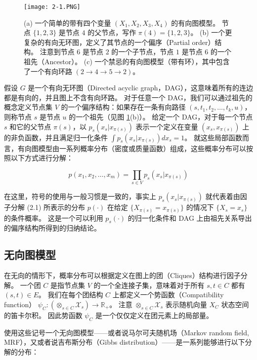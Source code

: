 \begin{figure}[htbp]
    \centering
    \texttt{[image: 2-1.PNG]}
    \caption{
        (a) 一个简单的带有四个变量 $(X_1, X_2, X_3, X_4)$ 的有向图模型。
        节点 $\{1, 2, 3\}$ 是节点 $4$ 的父节点，写作 $\pi(4) = \{1, 2, 3\}$。
        (b) 一个更复杂的有向无环图，定义了其节点的一个偏序（Partial order）结构。
        注意到节点 $6$ 是节点 $2$ 的一个子节点，节点 $1$ 是节点 $6$ 的一个祖先（Ancestor）。
        (c) 一个禁忌的有向图模型（带有环），其中包含了一个有向环路 $(2 \rightarrow 4 \rightarrow 5 \rightarrow 2)$。
    }\label{fig:2-1}
\end{figure}

假设 $G$ 是一个有向无环图（Directed acyclic graph，DAG），这意味着所有的连边都是有向的，并且图上不含有向环路。
对于任意一个 DAG，我们可以通过祖先的概念定义节点集 $V$ 的一个偏序结构：如果存在一条有向路径 $(s, t_1, t_2, \dots, t_k, u)$，则称节点 $s$ 是节点 $u$ 的一个祖先（见图 \ref{fig:2-1}(b)）。
给定一个 DAG，对于每一个节点 $s$ 和它的父节点 $\pi(s)$，以 $p_s(x_s|x_{\pi(s)})$ 表示一个定义在变量 $(x_s, x_{\pi(s)})$ 上的非负函数，并且满足归一化条件 $\int p_s(x_s|x_{\pi(s)})dx_s = 1$。
就这些局部函数而言，有向图模型由一系列概率分布（密度或质量函数）组成，这些概率分布可以按照以下方式进行分解：

\begin{equation}
    p(x_1, x_2, \dots, x_m) = \prod_{s \in V}p_s(x_s|x_{\pi(s)})
\end{equation}

在这里，符号的使用与一般习惯是一致的，事实上 $p_s(x_s|x_{\pi(s)})$ 就代表着由因子分解 (2.1) 所表示的分布 $p(\cdot)$ 在给定 $\{X_{\pi(s)} = x_{\pi(s)}\}$ 的情况下 $\{X_s = x_s\}$ 的条件概率。
这是一个可以利用 $p_s(\cdot)$ 的归一化条件和 DAG 上由祖先关系导出的偏序结构所得到的归纳结论。

\subsection{无向图模型}

在无向的情形下，概率分布可以根据定义在图上的团（Cliques）结构进行因子分解。
一个团 $C$ 是指节点集 $V$ 的一个全连接子集，意味着对于所有 $s, t \in C$ 都有 $(s, t) \in E$。
我们在每个团结构 $C$ 上都定义一个势函数（Compatibility function） $\psi_C: (\otimes_{s \in C}\mathcal{X}_s) \rightarrow \mathbb{R}_+$。
注意 $\otimes_{s \in C}\mathcal{X}_s$ 表示随机向量 $X_C$ 状态空间的笛卡尔积。
因此势函数 $\psi_C$ 是一个仅仅定义在团元素上的局部量。

使用这些记号一个无向图模型——或者说马尔可夫随机场（Markov random field, MRF），又或者说吉布斯分布（Gibbs distribution）——是一系列能够进行以下分解的分布：

